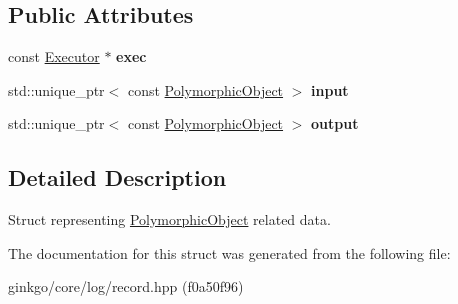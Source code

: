 \subsection*{Public Attributes}
\begin{DoxyCompactItemize}
\item 
\mbox{\label{structgko_1_1log_1_1polymorphic__object__data_a673a2c661ae7c582475d044cf37a8ec2}} 
const \hyperlink{classgko_1_1Executor}{Executor} $\ast$ {\bfseries exec}
\item 
\mbox{\label{structgko_1_1log_1_1polymorphic__object__data_a835d796a090caae61492e27e657e09d8}} 
std\+::unique\+\_\+ptr$<$ const \hyperlink{classgko_1_1PolymorphicObject}{Polymorphic\+Object} $>$ {\bfseries input}
\item 
\mbox{\label{structgko_1_1log_1_1polymorphic__object__data_a47d7c908e465c205de05fc7e4aac7613}} 
std\+::unique\+\_\+ptr$<$ const \hyperlink{classgko_1_1PolymorphicObject}{Polymorphic\+Object} $>$ {\bfseries output}
\end{DoxyCompactItemize}


\subsection{Detailed Description}
Struct representing \hyperlink{classgko_1_1PolymorphicObject}{Polymorphic\+Object} related data. 

The documentation for this struct was generated from the following file\+:\begin{DoxyCompactItemize}
\item 
ginkgo/core/log/record.\+hpp (f0a50f96)\end{DoxyCompactItemize}
